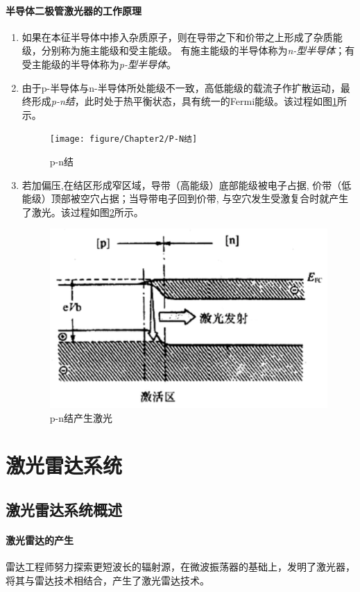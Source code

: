 \paragraph{半导体二极管激光器的工作原理}
\begin{enumerate}
	\item 如果在本征半导体中掺入杂质原子，则在导带之下和价带之上形成了杂质能级，分别称为施主能级和受主能级。
		有施主能级的半导体称为\textit{n-型半导体}；有受主能级的半导体称为\textit{p-型半导体}。
	\item 由于p-半导体与n-半导体所处能级不一致，高低能级的载流子作扩散运动，最终形成\textit{p-n结}，此时处于热平衡状态，具有统一的Fermi能级。该过程如图\ref{fig:p-n结}所示。
		\begin{figure}[htbp]
			\centering
			\texttt{[image: figure/Chapter2/P-N结]}
			\caption{p-n结}
			\label{fig:p-n结}
		\end{figure}
	\item 若加偏压,在结区形成窄区域，导带（高能级）底部能级被电子占据, 价带（低能级）顶部被空穴占据；当导带电子回到价带, 与空穴发生受激复合时就产生了激光。该过程如图\ref{fig:p-n结产生激光}所示。
		\begin{figure}[htbp]
			\centering
			\includegraphics[width=0.5\linewidth]{figure/Chapter2/p-n结产生激光}
			\caption{p-n结产生激光}
			\label{fig:p-n结产生激光}
		\end{figure}
\end{enumerate}

\section{激光雷达系统} %
\subsection{激光雷达系统概述} %

\paragraph{激光雷达的产生}雷达工程师努力探索更短波长的辐射源，在微波振荡器的基础上，发明了激光器，将其与雷达技术相结合，产生了激光雷达技术。

